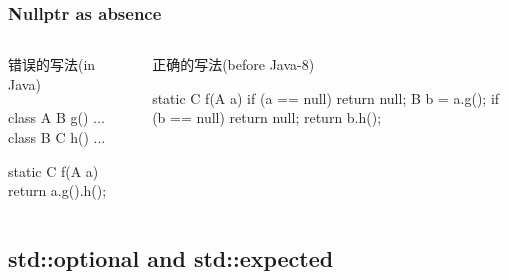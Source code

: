\documentclass[UTF8,lualatex]{ctexbeamer}
\begin{document}
\begin{frame}[fragile]
    \frametitle{Nullptr as absence}
    \begin{columns}[t]
        \footnotesize
        \begin{column}{.5\textwidth}
            \begin{alertblock}{错误的写法(in Java)}
                \begin{javacode}
                    class A {
                        B g() {...}
                    }
                    class B {
                        C h() {...}
                    }

                    static C f(A a) {
                        return a.g().h();
                    }
                \end{javacode}
            \end{alertblock}
        \end{column}
        \begin{column}{.5\textwidth}
            \begin{exampleblock}{正确的写法(before Java-8)}
                \begin{javacode}
                    static C f(A a) {
                        if (a == null) {
                            return null;
                        }
                        B b = a.g();
                        if (b == null) {
                            return null;
                        }
                        return b.h();
                    }
                \end{javacode}
            \end{exampleblock}
        \end{column}
    \end{columns}
\end{frame}


\subsection{std::optional and std::expected}
\end{document}
